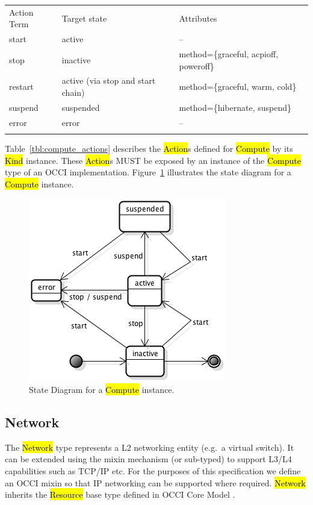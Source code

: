 \documentclass[10pt,a4paper]{article}
\begin{document}
{
	\begin{tabular}{lll}
	\toprule
	Action Term & Target state & Attributes \\
	\colrule
	start & active & -- \\
	stop & inactive & method=\{graceful, acpioff, poweroff\} \\
	restart & active (via stop and start chain) & method=\{graceful, warm, cold\} \\
	suspend & suspended & method=\{hibernate, suspend\} \\
	error & error & -- \\
	\botrule
	\end{tabular}
}

Table~\ref{tbl:compute_actions} describes the \hl{Action}s defined for
\hl{Compute} by its \hl{Kind} instance. These \hl{Action}s MUST be
exposed by an instance of the \hl{Compute} type of an OCCI
implementation.  Figure~\ref{fig:compute_state} illustrates the state
diagram for a \hl{Compute} instance.

\begin{figure}[!h]
	\centering
	\includegraphics[scale=0.4]{figs/compute-state.png}
	\caption{State Diagram for a \hl{Compute} instance.}
	\label{fig:compute_state}
\end{figure}

\subsection{Network}
The \hl{Network} type represents a L2 networking entity (e.g.~a
virtual switch). It can be extended using the mixin mechanism (or
sub-typed) to support L3/L4 capabilities such as TCP/IP etc.  For the
purposes of this specification we define an OCCI mixin so that IP
networking can be supported where required. \hl{Network} inherits the
\hl{Resource} base type defined in OCCI Core Model \cite{occi:core}.
\end{document}
